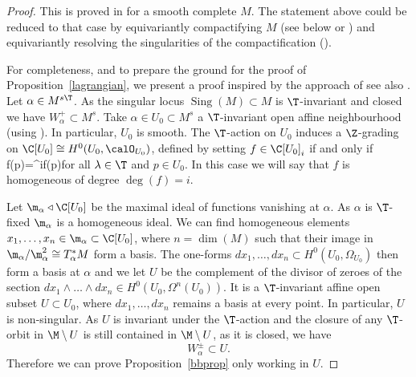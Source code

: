 \begin{proof} This is proved in \cite{bialynicki-birula} for a smooth complete $M$. The statement above could be reduced to that case by equivariantly compactifying $M$ (see below or \cite[Theorem 3]{sumihiro}) and equivariantly resolving the singularities of the compactification (\cite[Corollary 7.6.3]{villamayor}).

	For completeness, and to prepare the ground for the proof of Proposition~\ref{lagrangian}, we present a proof  inspired by the approach of \cite[Lemma 2.2]{bellamy-etal} see also \cite[\S 1]{drinfeld3}.
	Let $\alpha\in M^{s\T}$.  As the singular locus $\operatorname{Sing}(M)\subset M$ is $\T$-invariant and closed we have   $W^+_\alpha\subset M^s$. Take $\alpha\in U_0\subset M^s$  a $\T$-invariant open affine neighbourhood (using \cite[Corollary 2]{sumihiro}). In particular, $U_0$ is smooth.  The $\T$-action on $U_0$ induces a $\Z$-grading on $\C[U_0]\cong H^0(U_0,\calO_{U_0})$, defined by setting $f\in \C[U_0]_i$ if and only if \beq\label{transrule}f(\lambda p)=\lambda^if(p)\eeq for all $\lambda \in \T$ and $p\in U_0$. In this case we will say that $f$ is homogeneous of degree $\deg(f)=i$.

	Let $\m_\alpha\triangleleft \C[U_0]$ be the maximal ideal of functions vanishing at $\alpha$. As $\alpha$ is $\T$-fixed $\m_\alpha$ is a homogeneous ideal. We can find homogeneous elements $x_1,\dots,x_{n}\in \m_\alpha\subset \C[U_0]$, where $n=\dim(M)$ such that their image  in $\m_\alpha/\m_\alpha^2\cong T^*_\alpha M$ form a basis. The one-forms $dx_1,\dots, dx_n\subset H^0(U_0,\Omega_{U_0})$ then form a basis at $\alpha$ and we let $U$ be the complement of the divisor of zeroes of the section $dx_1\wedge\dots\wedge dx_n\in H^0(U_0,\Omega^n(U_0))$. It is a $\T$-invariant affine open subset $U\subset U_0$, where $dx_1,\dots, dx_n$ remains a basis at every point. In particular, $U$ is non-singular.
	As $U$ is invariant under the $\T$-action and the closure of any $\T$-orbit in $\M\setminus U$ is still contained in $\M\setminus U$, as it is closed,  we have   $$W^{\pm}_\alpha \subset U.$$ Therefore we can prove Proposition~\ref{bbprop} only working in $U$.


\end{proof}
